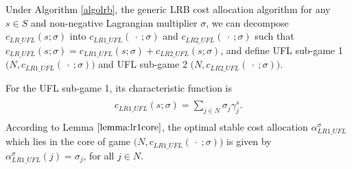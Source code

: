 \documentclass[ijoc,nonblindrev]{informs3} %
\begin{document}



Under Algorithm \ref{algolrb}, the generic LRB cost allocation algorithm for any $s \in S$ and non-negative Lagrangian multiplier $\sigma$, we can decompose $c_{LR\_UFL}(s;\sigma)$ into  $c_{LR1\_UFL}(\ \cdot \ ;\sigma)$ and $c_{LR2\_UFL}(\ \cdot \ ;\sigma)$ such that $c_{LR\_UFL}(s;\sigma) = c_{LR1\_UFL}(s;\sigma) + c_{LR2\_UFL}(s;\sigma)$, and define UFL sub-game 1 $\big(N,c_{LR1\_UFL}(\ \cdot \ ;\sigma)\big)$ and UFL sub-game 2  $\big(N,c_{LR2\_UFL}(\ \cdot \ ;\sigma)\big)$.

For the UFL sub-game 1, its characteristic function is
\begin{eqnarray}\label{eqn:UFLCFsub1}
\begin{aligned}
\begin{split}
c_{LR1\_UFL}(s;\sigma) = \sum_{j \in N} \sigma_j \gamma_j^s.
\end{split}
\end{aligned}
\end{eqnarray}
According to Lemma $\ref{lemma:lr1core}$,  the optimal stable cost allocation $\alpha_{LR1\_UFL}^{\sigma}$ which lies in the core of game $\big(N, c_{LR1\_UFL}(\ \cdot \ ;\sigma)\big)$ is given by $\alpha_{LR1\_UFL}^{\sigma}(j) = \sigma_j$, for all $j \in N$.
\end{document}
